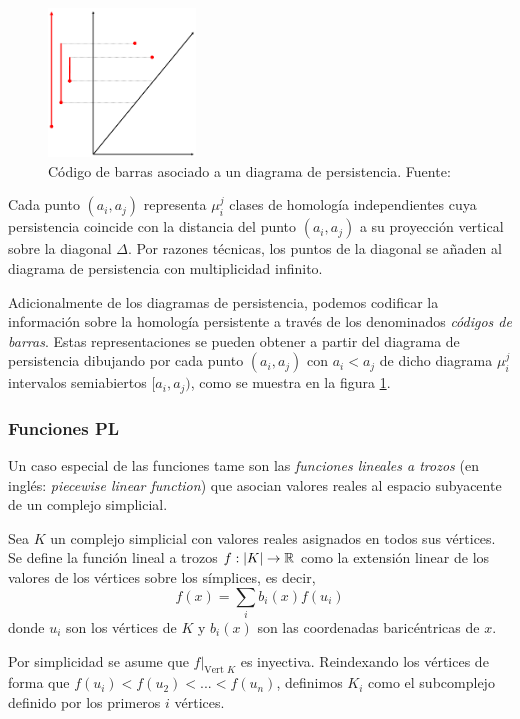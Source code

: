 \begin{figure}[!ht]
\centering
\includegraphics[width=0.35\textwidth]{include/figuras/The-Persistence-Diagram-Associated-to-a-Barcode.png} 
\caption{Código de barras asociado a un diagrama de persistencia. Fuente: \cite{articuloJustin}}
\label{ref:codigoBarras}
\end{figure}

Cada punto $(a_i, a_j)$ representa $\mu_{i}^{j}$ clases de homología independientes cuya persistencia coincide con la distancia del punto $(a_i, a_j)$ a su proyección vertical sobre la diagonal $\Delta$. Por razones técnicas, los puntos de la diagonal se añaden al diagrama de persistencia con multiplicidad infinito.

Adicionalmente de los diagramas de persistencia, podemos codificar la información sobre la homología persistente a través de los denominados \emph{códigos de barras}. Estas representaciones se pueden obtener a partir del diagrama de persistencia dibujando por cada punto $(a_i, a_j)$ con $a_i < a_j$ de dicho diagrama $\mu_{i}^{j}$ intervalos semiabiertos $[a_i, a_j)$, como se muestra en la figura \ref{ref:codigoBarras}.

\subsubsection*{Funciones PL}\label{sec:funcionesPL}
Un caso especial de las funciones tame son las \emph{funciones lineales a trozos} (en inglés: \emph{piecewise linear function}) que asocian valores reales al espacio subyacente de un complejo simplicial.

\begin{definition}
Sea $K$ un complejo simplicial con valores reales asignados en todos sus vértices. Se define la función lineal a trozos $f: \lvert K\rvert \to \mathbb{R}$ como la extensión linear de los valores de los vértices sobre los símplices, es decir,
\[
f(x)=\sum_{i} b_i(x)f(u_i)
\]
donde $u_i$ son los vértices de $K$ y $b_i(x)$ son las coordenadas baricéntricas de $x$.
\end{definition}
Por simplicidad se asume que $f\vert_{\text{Vert }K}$ es inyectiva. Reindexando los vértices de forma que $f(u_i) < f(u_2) < ... < f(u_n)$, definimos $K_i$ como el subcomplejo definido por los primeros $i$ vértices.

